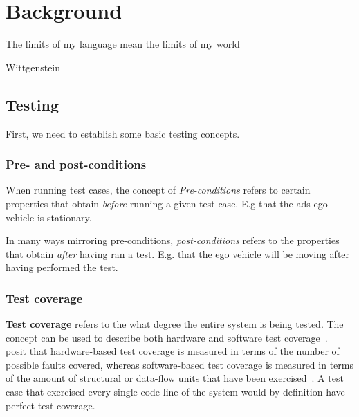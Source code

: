 \chapter{Background}\label{sec:background}

\epigraph{The limits of my language mean the limits of my world}{Wittgenstein}

\section{Testing}

First, we need to establish some basic testing concepts.

\subsection{Pre- and post-conditions}\label{sec:testingConditions}

When running test cases, the concept of \textit{Pre-conditions}
refers to certain properties that
obtain \textit{before} running a given test case. E.g that the \acrshort{ads} ego vehicle is
stationary.

In many ways mirroring pre-conditions, \textit{post-conditions} refers to the properties that obtain
\textit{after} having ran a test. E.g. that the ego vehicle will be moving after having performed
the test.


\subsection{Test coverage}\label{sec:testCoverage}

\textbf{Test coverage} refers to the what degree the entire system is being tested. The concept can
be used to describe both hardware and software test
coverage~\cite[187]{testCoverage94}.~\citeauthor{testCoverage94} posit that hardware-based test
coverage is measured in terms of the number of possible faults covered, whereas software-based test
coverage is measured in terms of the amount of structural or data-flow units that have been
exercised~\cite[187]{testCoverage94}. A test case that exercised every single code line of the
system would by definition have perfect test coverage.


% 

